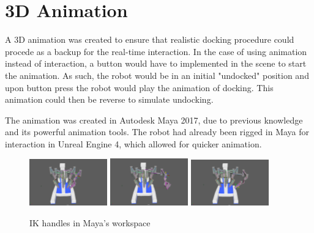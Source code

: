 \section*{3D Animation}
A 3D animation was created to ensure that realistic docking procedure could procede as a backup for the real-time interaction. In the case of using animation instead of interaction, a button would have to implemented in the scene to start the animation. As such, the robot would be in an initial "undocked" position and upon button press the robot would play the animation of docking. This animation could then be reverse to simulate undocking.

The animation was created in Autodesk Maya 2017, due to previous knowledge and its powerful animation tools. The robot had already been rigged in Maya for interaction in Unreal Engine 4, which allowed for quicker animation.

\begin{figure}[hpbt]
	\centering
	\includegraphics[width=0.3\textwidth]{ModelAnim/IK1}
	\includegraphics[width=0.3\textwidth]{ModelAnim/IK2}
	\includegraphics[width=0.3\textwidth]{ModelAnim/IK3}
	\caption{IK handles in Maya's workspace}
\end{figure}